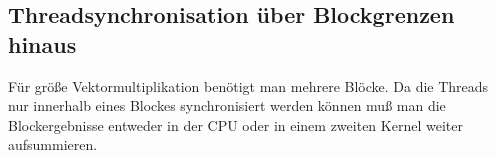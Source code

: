 
\subsection{Threadsynchronisation über Blockgrenzen hinaus}

Für größe Vektormultiplikation benötigt man mehrere Blöcke.
Da die Threads nur innerhalb eines Blockes synchronisiert
werden können muß man die Blockergebnisse entweder
in der CPU oder in einem zweiten Kernel weiter aufsummieren.